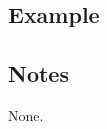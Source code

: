 \documentclass[a4paper,11pt]{article}
\begin{document}
\subsection*{Example}


\subsection*{Notes}

None.
\end{document}
